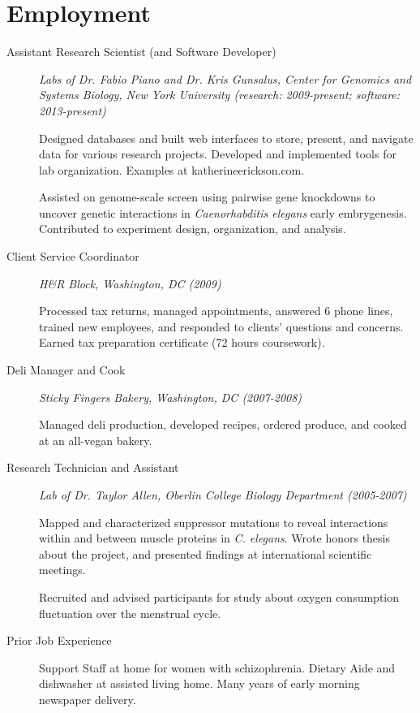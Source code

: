 \documentclass{article}
\begin{document}
	\section*{Employment}
	\begin{description}
		\item[Assistant Research Scientist (and Software Developer)]
		\emph{Labs of Dr. Fabio Piano and Dr. Kris Gunsalus,
			Center for Genomics and Systems Biology,
			New York University
			(research: 2009-present; software: 2013-present)
		}

		Designed databases and built web interfaces to store, present, 
		and navigate data for various research projects.
		Developed and implemented tools for lab organization.
		Examples at katherineerickson.com.
		
		Assisted on genome-scale screen using pairwise gene knockdowns to uncover
		genetic interactions in \emph{Caenorhabditis elegans} early embrygenesis. 
		Contributed to experiment design, organization, and analysis.

		\item[Client Service Coordinator]
		\emph{H\&R Block, Washington, DC (2009)}
			
		Processed tax returns, managed appointments, answered 6 phone lines, 
		trained new employees, and responded to clients' questions and concerns.
		Earned tax preparation certificate (72 hours coursework).

		\item[Deli Manager and Cook]
		\emph{Sticky Fingers Bakery, Washington, DC (2007-2008)}
		
		Managed deli production, developed recipes, ordered produce,
		and cooked at an all-vegan bakery.

		\item[Research Technician and Assistant]
		\emph{Lab of Dr. Taylor Allen,
			Oberlin College Biology Department (2005-2007)
		}
		
		Mapped and characterized suppressor mutations to reveal interactions 
		within and between muscle proteins in \emph{C. elegans}.
		Wrote honors thesis about the project, 
		and presented findings at international scientific meetings.

		Recruited and advised participants for study about oxygen
		consumption fluctuation over the menstrual cycle.

		\item[Prior Job Experience]
		Support Staff at home for women with schizophrenia.
		Dietary Aide and dishwasher at assisted living home.
		Many years of early morning newspaper delivery.
	\end{description}
\end{document}
